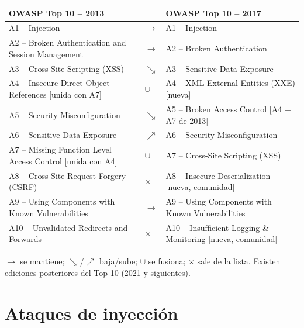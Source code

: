 \documentclass[11pt,a4paper]{report}
\begin{document}
\begin{center}
\small
{\setlength{\aboverulesep}{0pt}\setlength{\belowrulesep}{0pt}\renewcommand{\arraystretch}{1.2}%
\begin{tabularx}{\linewidth}{>{\raggedright\arraybackslash}X !{\color{gray!45}\vrule width 0.2pt} >{\centering\arraybackslash}p{0.6cm} !{\color{gray!45}\vrule width 0.2pt} >{\raggedright\arraybackslash}X}
\toprule
\textbf{OWASP Top 10 -- 2013} & & \textbf{OWASP Top 10 -- 2017} \\
\midrule
A1 -- Injection & $\to$ & A1 -- Injection \\
A2 -- Broken Authentication and Session Management & $\to$ & A2 -- Broken Authentication \\
A3 -- Cross-Site Scripting (XSS) & $\searrow$ & A3 -- Sensitive Data Exposure \\
A4 -- Insecure Direct Object References \textcolor{green!50!black}{[unida con A7]} & $\cup$ & A4 -- XML External Entities (XXE) \textcolor{red!60!black}{[nueva]} \\
A5 -- Security Misconfiguration & $\searrow$ & A5 -- Broken Access Control \textcolor{red!60!black}{[A4 + A7 de 2013]} \\
A6 -- Sensitive Data Exposure & $\nearrow$ & A6 -- Security Misconfiguration \\
A7 -- Missing Function Level Access Control \textcolor{green!50!black}{[unida con A4]} & $\cup$ & A7 -- Cross-Site Scripting (XSS) \\
A8 -- Cross-Site Request Forgery (CSRF) & $\times$ & A8 -- Insecure Deserialization \textcolor{red!60!black}{[nueva, comunidad]} \\
A9 -- Using Components with Known Vulnerabilities & $\to$ & A9 -- Using Components with Known Vulnerabilities \\
A10 -- Unvalidated Redirects and Forwards & $\times$ & A10 -- Insufficient Logging \& Monitoring \textcolor{red!60!black}{[nueva, comunidad]} \\
\bottomrule
\end{tabularx}}
\end{center}
{\small $\to$ se mantiene; $\searrow$/$\nearrow$ baja/sube; $\cup$ se fusiona; $\times$ sale de la lista. Existen ediciones posteriores del Top 10 (2021 y siguientes).}
 
\section{Ataques de inyección}
 
\end{document}
